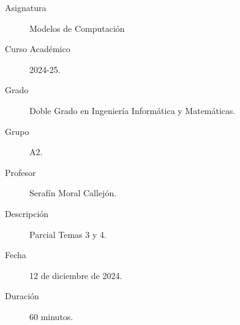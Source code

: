 \documentclass[12pt]{article}
\begin{document}

    
    

    \begin{description}
        \item[Asignatura] Modelos de Computación
        \item[Curso Académico] 2024-25.
        \item[Grado] Doble Grado en Ingeniería Informática y Matemáticas.
        \item[Grupo] A2.
        \item[Profesor] Serafín Moral Callejón.
        \item[Descripción] Parcial Temas 3 y 4.
        \item[Fecha] 12 de diciembre de 2024.
        \item[Duración] 60 minutos.    
    \end{description}
    \newpage
\end{document}
